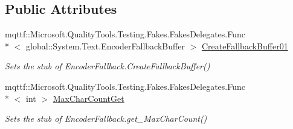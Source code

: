 \subsection*{Public Attributes}
\begin{DoxyCompactItemize}
\item 
mqttf\-::\-Microsoft.\-Quality\-Tools.\-Testing.\-Fakes.\-Fakes\-Delegates.\-Func\\*
$<$ global\-::\-System.\-Text.\-Encoder\-Fallback\-Buffer $>$ \hyperlink{class_system_1_1_text_1_1_fakes_1_1_stub_encoder_fallback_a7bc66d7307ed94304cc37225ba046ee9}{Create\-Fallback\-Buffer01}
\begin{DoxyCompactList}\small\item\em Sets the stub of Encoder\-Fallback.\-Create\-Fallback\-Buffer()\end{DoxyCompactList}\item 
mqttf\-::\-Microsoft.\-Quality\-Tools.\-Testing.\-Fakes.\-Fakes\-Delegates.\-Func\\*
$<$ int $>$ \hyperlink{class_system_1_1_text_1_1_fakes_1_1_stub_encoder_fallback_ad20197b45a9e491422bd10c5ada1df42}{Max\-Char\-Count\-Get}
\begin{DoxyCompactList}\small\item\em Sets the stub of Encoder\-Fallback.\-get\-\_\-\-Max\-Char\-Count()\end{DoxyCompactList}\end{DoxyCompactItemize}
